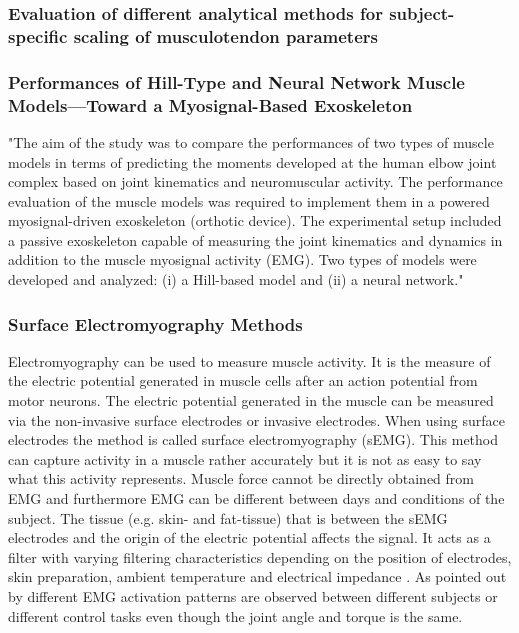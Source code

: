 \subsubsection{Evaluation of different analytical methods for subject-specific scaling of musculotendon parameters}

\subsubsection{Performances of Hill-Type and Neural Network Muscle
Models—Toward a Myosignal-Based Exoskeleton}

"The aim of the study was to compare the performances of two types of muscle models in terms of predicting the moments developed at the human elbow joint complex based on joint kinematics and neuromuscular activity. The performance evaluation of the muscle models was required to implement them in a powered myosignal-driven exoskeleton (orthotic device). The experimental setup included a passive exoskeleton capable of measuring the joint kinematics and dynamics in addition to the muscle myosignal activity (EMG). Two types of models were developed and analyzed: (i) a Hill-based model and (ii) a neural network." \cite[p. 1]{Rosen1999}

\subsubsection{Surface Electromyography Methods}
Electromyography can be used to measure muscle activity. 
It is the measure of the electric potential generated in muscle cells after an action potential from motor neurons. 
The electric potential generated in the muscle can be measured via the non-invasive surface electrodes or invasive electrodes. 
When using surface electrodes the method is called surface electromyography (sEMG). 
This method can capture activity in a muscle rather accurately but it is not as easy to say what this activity represents. 
Muscle force cannot be directly obtained from EMG and furthermore EMG can be different between days and conditions of the subject. 
The tissue (e.g. skin- and fat-tissue) that is between the sEMG electrodes and the origin of the electric potential affects the signal. 
It acts as a filter with varying filtering characteristics depending on the position of electrodes, skin preparation, ambient temperature and electrical impedance \cite{Lloyd2003}.  
As pointed out by  different EMG activation patterns are observed between different subjects or different control tasks even though the joint angle and torque is the same.

